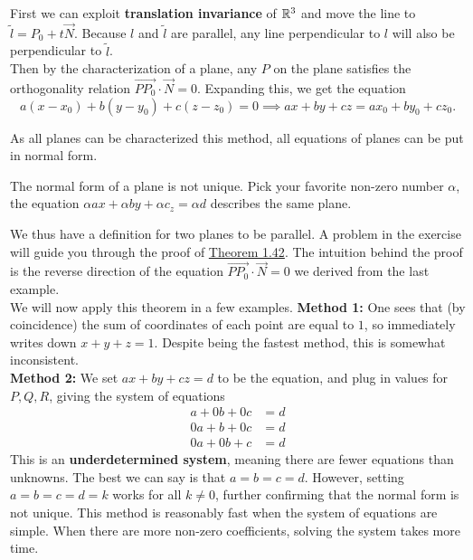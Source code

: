 First we can exploit \textbf{translation invariance} of $\mathbb{R}^3$ and move the line to $\tilde{l}=P_0 + t\vec{N}$. Because $l$ and $\tilde{l}$ are parallel, any line perpendicular to $l$ will also be perpendicular to $\tilde{l}$.\\
Then by the characterization of a plane, any $P$ on the plane satisfies the orthogonality relation $\overrightarrow{PP_0}\cdot\vec{N}=0$. Expanding this, we get the equation \[
a(x-x_0)+b(y-y_0)+c(z-z_0)=0 \implies ax+by+cz=ax_0+by_0+cz_0.
\]
\begin{remark}
	As all planes can be characterized this method, all equations of planes can be put in normal form.
\end{remark}
\begin{remark}
	The normal form of a plane is not unique. Pick your favorite non-zero number $\alpha$, the equation $\alpha ax+\alpha by+\alpha c_z=\alpha d$ describes the same plane.
\end{remark}
We thus have a definition for two planes to be parallel.
A problem in the exercise will guide you through the proof of \hyperref[thm:1.42]{Theorem 1.42}. The intuition behind the proof is the reverse direction of the equation $\overrightarrow{PP_0}\cdot\vec{N}=0$ we derived from the last example.\\
We will now apply this theorem in a few examples.
\textbf{Method 1:} One sees that (by coincidence) the sum of coordinates of each point are equal to $1$, so immediately writes down $x+y+z=1$. Despite being the fastest method, this is somewhat inconsistent.\\


\textbf{Method 2:} We set $ax+by+cz=d$ to be the equation, and plug in values for $P,Q,R$, giving the system of equations\begin{align*}
	a+0b+0c&=d \\ 0a+b+0c&=d \\ 0a+0b+c&=d 
\end{align*}
This is an \textbf{underdetermined system}, meaning there are fewer equations than unknowns. The best we can say is that $a=b=c=d$. However, setting $a=b=c=d=k$ works for all $k\neq 0$, further confirming that the normal form is not unique. This method is reasonably fast when the system of equations are simple. When there are more non-zero coefficients, solving the system takes more time.\\

